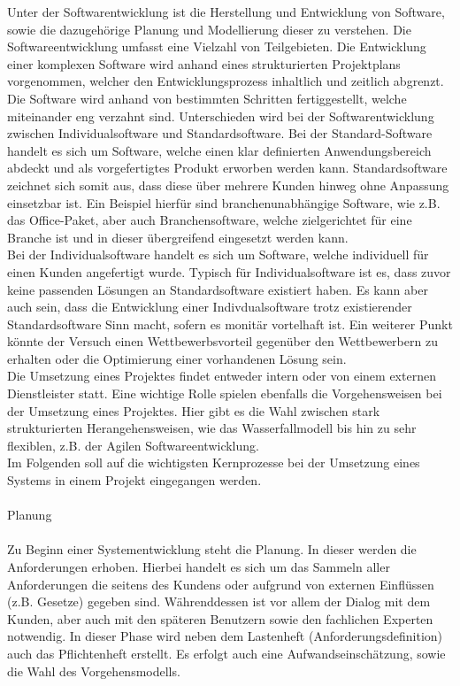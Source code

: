Unter der Softwarentwicklung ist die Herstellung und Entwicklung von Software, sowie die dazugehörige Planung und Modellierung dieser zu verstehen. Die Softwareentwicklung umfasst eine Vielzahl von Teilgebieten. Die Entwicklung einer komplexen Software wird anhand eines strukturierten Projektplans vorgenommen, welcher den Entwicklungsprozess inhaltlich und zeitlich abgrenzt. Die Software wird anhand von bestimmten Schritten fertiggestellt, welche miteinander eng verzahnt sind. Unterschieden wird bei der Softwarentwicklung zwischen Individualsoftware und Standardsoftware. Bei der Standard-Software handelt es sich um Software, welche einen klar definierten Anwendungsbereich abdeckt und als vorgefertigtes Produkt erworben werden kann. Standardsoftware zeichnet sich somit aus, dass diese über mehrere Kunden hinweg ohne Anpassung einsetzbar ist. Ein Beispiel hierfür sind branchenunabhängige Software, wie z.B. das Office-Paket, aber auch Branchensoftware, welche zielgerichtet für eine Branche ist und in dieser übergreifend eingesetzt werden kann.\\
Bei der Individualsoftware handelt es sich um Software, welche individuell für einen Kunden angefertigt wurde. Typisch für Individualsoftware ist es, dass zuvor keine passenden Lösungen an Standardsoftware existiert haben.  Es kann aber auch sein, dass die Entwicklung einer Indivdualsoftware trotz existierender Standardsoftware Sinn macht, sofern es monitär vortelhaft ist.
Ein weiterer Punkt  könnte der Versuch einen Wettbewerbsvorteil gegenüber den Wettbewerbern zu erhalten oder die Optimierung einer vorhandenen Lösung sein.\\
Die Umsetzung eines Projektes findet entweder intern oder von einem externen Dienstleister statt. Eine wichtige Rolle spielen ebenfalls die Vorgehensweisen bei der Umsetzung eines Projektes. Hier gibt es die Wahl zwischen stark strukturierten Herangehensweisen, wie das Wasserfallmodell bis hin zu sehr flexiblen, z.B. der Agilen Softwareentwicklung.\\
Im Folgenden soll auf die wichtigsten Kernprozesse bei der Umsetzung eines Systems in einem Projekt eingegangen werden.\\
\\
Planung\\
\\
Zu Beginn einer Systementwicklung steht die Planung. In dieser werden die Anforderungen erhoben. Hierbei handelt es sich um das Sammeln aller Anforderungen die seitens des Kundens oder aufgrund von externen Einflüssen (z.B. Gesetze) gegeben sind. Währenddessen ist vor allem der Dialog mit dem Kunden, aber auch mit den späteren Benutzern sowie den fachlichen Experten notwendig. In dieser Phase wird neben dem Lastenheft (Anforderungsdefinition) auch das Pflichtenheft erstellt. Es erfolgt auch eine Aufwandseinschätzung, sowie die Wahl des Vorgehensmodells.\\
